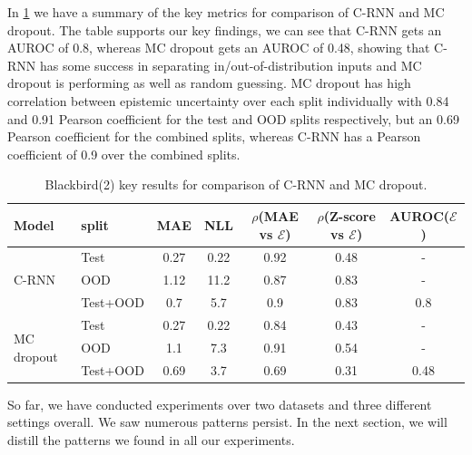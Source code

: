 In \cref{tbl:bb2_comparison} we have a summary of the key metrics for comparison of C-RNN and MC dropout. The table supports our key findings, we can see that C-RNN gets an AUROC of 0.8, whereas MC dropout gets an AUROC of 0.48, showing that C-RNN has some success in separating in/out-of-distribution inputs and MC dropout is performing as well as random guessing. MC dropout has high correlation between epistemic uncertainty over each split individually with 0.84 and 0.91 Pearson coefficient for the test and OOD splits respectively, but an 0.69 Pearson coefficient for the combined splits, whereas C-RNN has a Pearson coefficient of 0.9 over the combined splits.  

\begin{table}[h]
\centering
    \begin{tabular}{l l c c c c c}  
        \toprule
        Model & split & MAE & NLL & $\rho$(MAE vs $\mathcal{E}$) &
        $\rho$(Z-score vs $\mathcal{E}$) & AUROC($\mathcal{E}$)\\
        \midrule
        \multirow{3}{*}{C-RNN} 
            & Test     & 0.27 & 0.22 & 0.92 & 0.48 & - \\  
            & OOD      & 1.12 & 11.2 & 0.87 & 0.83 & -\\  
            & Test+OOD & 0.7  & 5.7  & 0.9  & 0.83 & 0.8\\ 

        \midrule
        \multirow{3}{*}{MC dropout} 
            & Test     & 0.27 & 0.22 & 0.84  & 0.43 & - \\  
            & OOD      & 1.1 & 7.3   & 0.91  & 0.54 & -\\  
            & Test+OOD & 0.69 & 3.7  & 0.69  & 0.31 & 0.48\\ 

        \toprule
    \end{tabular}
    \caption{Blackbird(2) key results for comparison of C-RNN and MC dropout.}
    \label{tbl:bb2_comparison}
\end{table}

So far, we have conducted experiments over two datasets and three different settings overall. We saw numerous patterns persist. In the next section, we will distill the patterns we found in all our experiments.


